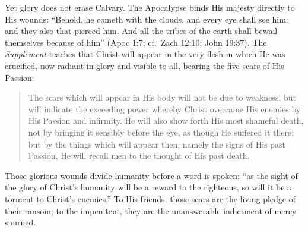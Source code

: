 Yet glory does not erase Calvary. The Apocalypse binds His majesty directly to His wounds: ``Behold, he cometh with the clouds, and every eye shall see him: and they also that pierced him. And all the tribes of the earth shall bewail themselves because of him'' (Apoc 1:7; cf.\ Zach 12:10; John 19:37). The \textit{Supplement} teaches that Christ will appear in the very flesh in which He was crucified, now radiant in glory and visible to all, bearing the five scars of His Passion:

\begin{quote}
The scars which will appear in His body will not be due to weakness, but will indicate the exceeding power whereby Christ overcame His enemies by His Passion and infirmity. He will also show forth His most shameful death, not by bringing it sensibly before the eye, as though He suffered it there; but by the things which will appear then, namely the signs of His past Passion, He will recall men to the thought of His past death.
\end{quote}

Those glorious wounds divide humanity before a word is spoken: ``as the sight of the glory of Christ's humanity will be a reward to the righteous, so will it be a torment to Christ's enemies.'' To His friends, those scars are the living pledge of their ransom; to the impenitent, they are the unanswerable indictment of mercy spurned.
